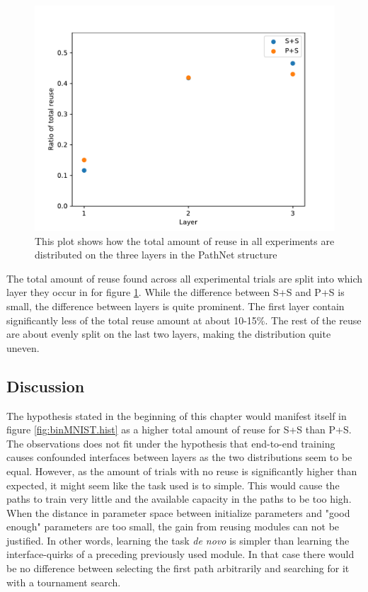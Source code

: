 \begin{figure}[t]
    \includegraphics[width=\textwidth]{Chapters/4.Experiments/exp1/figures/BIN_reuse_by_layer.pdf}
    \caption[Reuse by layer for binary MNIST classification]{This plot shows how the total amount of reuse in all experiments are distributed on the three layers in the PathNet structure }
    \label{fig:binMNIST.layer_reuse}
\end{figure}
 
The total amount of reuse found across all experimental trials are split into which layer they occur in for figure \ref{fig:binMNIST.layer_reuse}. While the difference between S+S and P+S is small, the difference between layers is quite prominent. The first layer contain significantly less of the total reuse amount at about 10-15\%. The rest of the reuse are about evenly split on the last two layers, making the distribution quite uneven. 


\subsection{Discussion}
\label{exp1:BIN.discussion}
The hypothesis stated in the beginning of this chapter would manifest itself in figure \ref{fig:binMNIST.hist} as a higher total amount of reuse for S+S than P+S. The observations does not fit under the hypothesis that end-to-end training causes confounded interfaces between layers as the two distributions seem to be equal. However, as the amount of trials with no reuse is significantly higher than expected, it might seem like the task used is to simple. This would cause the paths to train very little and the available capacity in the paths to be too high. When the distance in parameter space between initialize parameters and "good enough" parameters are too small, the gain from reusing modules can not be justified. In other words, learning the task \textit{de novo} is simpler than learning the interface-quirks of a preceding previously used module. In that case there would be no difference between selecting the first path arbitrarily and searching for it with a tournament search. 

